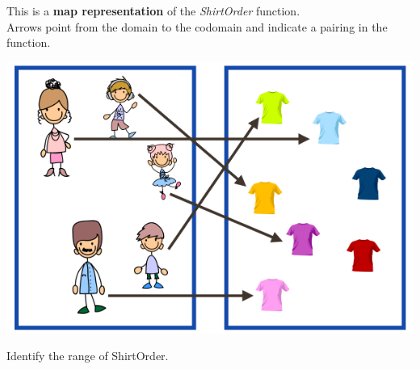 \documentclass{ximera}
\author{Lee Wayand}
\begin{document}
\begin{exercise}





This is a \textbf{map representation} of the \textit{ShirtOrder} function. \\

Arrows point from the domain to the codomain and indicate a pairing in the function.

\begin{image}
\includegraphics{pics/f_12.png}
\end{image}










Identify the range of ShirtOrder.




\end{exercise}
\end{document}
